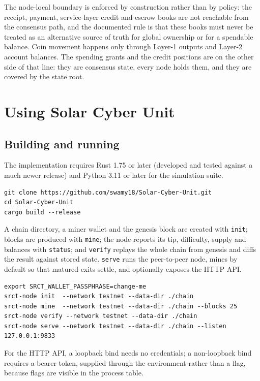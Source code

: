\documentclass{article}
\begin{document}
The node-local boundary is enforced by construction rather than by policy: the
receipt, payment, service-layer credit and escrow books are not reachable from
the consensus path, and the documented rule is that these books must never be
treated as an alternative source of truth for global ownership or for a
spendable balance. Coin movement happens only through Layer-1 outputs and
Layer-2 account balances. The spending grants and the credit positions are on
the other side of that line: they are consensus state, every node holds them,
and they are covered by the state root.


\section{Using Solar Cyber Unit}
\label{sec:usage}

\subsection{Building and running}

The implementation requires Rust 1.75 or later (developed and tested against a
much newer release) and Python 3.11 or later for the simulation suite.

\begin{verbatim}
git clone https://github.com/swamy18/Solar-Cyber-Unit.git
cd Solar-Cyber-Unit
cargo build --release
\end{verbatim}

A chain directory, a miner wallet and the genesis block are created with
\texttt{init}; blocks are produced with \texttt{mine}; the node reports its tip,
difficulty, supply and balances with \texttt{status}; and \texttt{verify}
replays the whole chain from genesis and diffs the result against stored state.
\texttt{serve} runs the peer-to-peer node, mines by default so that matured
exits settle, and optionally exposes the HTTP API.

\begin{verbatim}
export SRCT_WALLET_PASSPHRASE=change-me
srct-node init  --network testnet --data-dir ./chain
srct-node mine  --network testnet --data-dir ./chain --blocks 25
srct-node verify --network testnet --data-dir ./chain
srct-node serve --network testnet --data-dir ./chain --listen 127.0.0.1:9833
\end{verbatim}

For the HTTP API, a loopback bind needs no credentials; a non-loopback bind
requires a bearer token, supplied through the environment rather than a flag,
because flags are visible in the process table.
\end{document}
